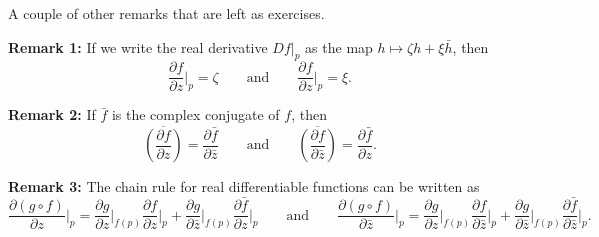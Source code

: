 \documentclass[10pt,aspectratio=169]{beamer}
\begin{document}
\begin{frame}
A couple of other remarks that are left as exercises.

\medskip
\pause
\textbf{Remark 1:}
If we write the real derivative $Df|_p$ as the map $h \mapsto \zeta h + \xi \bar{h}$,
\pause
then
\[
\frac{\partial f}{\partial z}\big|_p = \zeta
\qquad \text{and} \qquad
\frac{\partial f}{\partial z}\big|_p = \xi .
\]

\medskip
\pause
\textbf{Remark 2:}
If $\bar{f}$ is the complex conjugate of $f$, then
\pause
\[
\overline{\left(\frac{\partial f}{\partial z}\right)} = 
\frac{\partial \bar{f}}{\partial \bar{z}}
\qquad \text{and} \qquad
\overline{\left(\frac{\partial f}{\partial \bar{z}}\right)} = 
\frac{\partial \bar{f}}{\partial z} .
\]

\medskip
\pause
\textbf{Remark 3:} The chain rule for real differentiable functions
can be written as
\[
\frac{\partial (g \circ f)}{\partial z}\Big|_p
=
\frac{\partial g}{\partial z}\Big|_{f(p)}
\frac{\partial f}{\partial z}\Big|_p
+
\frac{\partial g}{\partial \bar{z}}\Big|_{f(p)}
\frac{\partial \bar{f}}{\partial z}\Big|_p
\qquad
\text{and}
\qquad
\frac{\partial (g \circ f)}{\partial \bar{z}}\Big|_p
=
\frac{\partial g}{\partial z}\Big|_{f(p)}
\frac{\partial f}{\partial \bar{z}}\Big|_p
+
\frac{\partial g}{\partial \bar{z}}\Big|_{f(p)}
\frac{\partial \bar{f}}{\partial \bar{z}}\Big|_p .
\]
\end{frame}
\end{document}

